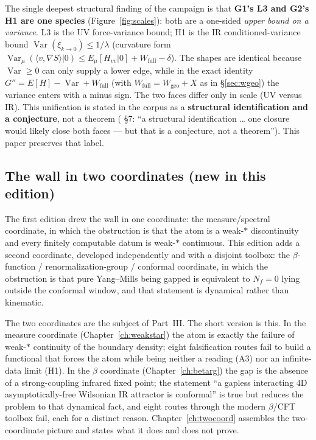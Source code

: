 The single deepest structural finding of the campaign is that \textbf{G1's L3 and G2's H1 are one
species} (Figure~\ref{fig:scales}): both are a one-sided \emph{upper bound on a variance}. L3 is
the UV force-variance bound; H1 is the IR conditioned-variance bound
$\operatorname{Var}(\xi_{k\to0})\le1/\lambda$ (curvature form
$\operatorname{Var}_\mu(\langle v,\nabla S\rangle|0)\le E_\mu[H_{vv}|0]+W_{\mathrm{full}}-\delta$).
The shapes are identical because $\operatorname{Var}\ge0$ can only supply a lower edge, while in
the exact identity $G''=E[H]-\operatorname{Var}+W_{\mathrm{full}}$ (with
$W_{\mathrm{full}}=W_{\mathrm{geo}}+X$ as in \S\ref{sec:wgeo}) the variance enters with a minus
sign. The two faces differ only in scale (UV versus IR). This unification is stated in the corpus
as a \textbf{structural identification and a conjecture}, not a theorem
( \S7: ``a structural identification \ldots{} one closure would likely
close both faces --- but that is a conjecture, not a theorem''). This paper preserves that label.

\figscales

\subsection{The wall in two coordinates (new in this edition)}
\label{sec:preview-twocoord}

The first edition drew the wall in one coordinate: the measure/spectral coordinate, in which the
obstruction is that the atom is a weak-$*$ discontinuity and every finitely computable datum is
weak-$*$ continuous. This edition adds a second coordinate, developed independently and with a
disjoint toolbox: the $\beta$-function / renormalization-group / conformal coordinate, in which
the obstruction is that pure Yang--Mills being gapped is equivalent to $N_f=0$ lying outside the
conformal window, and that statement is dynamical rather than kinematic.

The two coordinates are the subject of Part~III. The short version is this. In the measure
coordinate (Chapter~\ref{ch:weakstar}) the atom is exactly the failure of weak-$*$ continuity of
the boundary density; eight falsification routes fail to build a functional that forces the atom
while being neither a reading (A3) nor an infinite-data limit (H1). In the $\beta$ coordinate
(Chapter~\ref{ch:betarg}) the gap is the absence of a strong-coupling infrared fixed point; the
statement ``a gapless interacting 4D asymptotically-free Wilsonian IR attractor is conformal'' is
true but reduces the problem to that dynamical fact, and eight routes through the modern
$\beta$/CFT toolbox fail, each for a distinct reason. Chapter~\ref{ch:twocoord} assembles the
two-coordinate picture and states what it does and does not prove.

